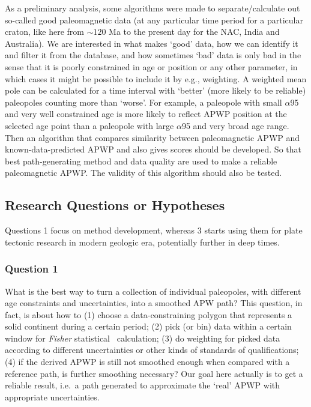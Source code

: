 As a preliminary analysis, some algorithms were made to separate/calculate out
so-called good paleomagnetic data (at any particular time period for a
particular craton, like here from ${\sim}120$ Ma to the present day for the
NAC, India and Australia). We are interested in what makes `good' data, how we
can identify it and
filter it from the database, and how sometimes `bad' data is only bad in the
sense that it is poorly constrained in age or position or any other parameter,
in which cases it might be possible to include it by e.g., weighting. A weighted
mean pole can be calculated for a time interval with `better' (more likely to be
reliable) paleopoles counting more than `worse'. For example, a paleopole with
small $\alpha$95 and very well constrained age is more likely to reflect APWP
position at the selected age point than a paleopole with large $\alpha$95 and
very broad age range. Then an algorithm that compares similarity between
paleomagnetic APWP and known-data-predicted APWP and also gives scores should be
developed. So that best path-generating method and data quality are used to
make a reliable paleomagnetic APWP\@. The validity of this algorithm should also
be tested.

\subsection{Research Questions or Hypotheses}

Questions 1 focus on method development, whereas 3 starts
using them for plate tectonic research in modern geologic era, potentially
further in deep times.

\subsubsection{Question 1}

What is the best way to turn a collection of individual paleopoles, with
different age constraints and uncertainties, into a smoothed APW path? This
question, in fact, is about how to (1) choose a data-constraining polygon that
represents a solid continent during a certain period; (2) pick (or bin) data
within a certain window for \emph{Fisher} statistical~\citep{F53} calculation; (3) do
weighting for picked data according to different uncertainties or other kinds of
standards of qualifications; (4) if the derived APWP is still not smoothed
enough when compared with a reference path, is further smoothing necessary? Our
goal here actually is to get a reliable result, i.e.\ a path generated to
approximate the `real' APWP with appropriate uncertainties.

